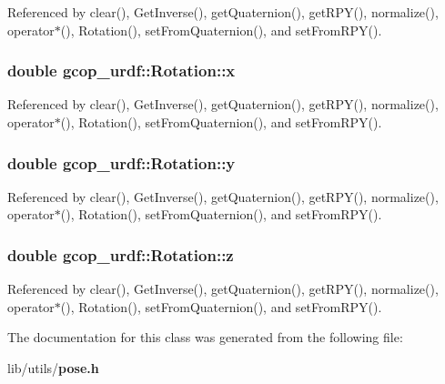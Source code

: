 \-Referenced by clear(), \-Get\-Inverse(), get\-Quaternion(), get\-R\-P\-Y(), normalize(), operator$\ast$(), \-Rotation(), set\-From\-Quaternion(), and set\-From\-R\-P\-Y().

\subsubsection[{x}]{\setlength{\rightskip}{0pt plus 5cm}double {\bf gcop\-\_\-urdf\-::\-Rotation\-::x}}\label{classgcop__urdf_1_1Rotation_af938927a04fcdd92dc1c143a7b387821}


\-Referenced by clear(), \-Get\-Inverse(), get\-Quaternion(), get\-R\-P\-Y(), normalize(), operator$\ast$(), \-Rotation(), set\-From\-Quaternion(), and set\-From\-R\-P\-Y().

\subsubsection[{y}]{\setlength{\rightskip}{0pt plus 5cm}double {\bf gcop\-\_\-urdf\-::\-Rotation\-::y}}\label{classgcop__urdf_1_1Rotation_a5bdcb247780b1ced0b9e49ee441f1728}


\-Referenced by clear(), \-Get\-Inverse(), get\-Quaternion(), get\-R\-P\-Y(), normalize(), operator$\ast$(), \-Rotation(), set\-From\-Quaternion(), and set\-From\-R\-P\-Y().

\subsubsection[{z}]{\setlength{\rightskip}{0pt plus 5cm}double {\bf gcop\-\_\-urdf\-::\-Rotation\-::z}}\label{classgcop__urdf_1_1Rotation_ab1c02ae2856ed4ffcf504104220906a2}


\-Referenced by clear(), \-Get\-Inverse(), get\-Quaternion(), get\-R\-P\-Y(), normalize(), operator$\ast$(), \-Rotation(), set\-From\-Quaternion(), and set\-From\-R\-P\-Y().



\-The documentation for this class was generated from the following file\-:\begin{DoxyCompactItemize}
\item 
lib/utils/{\bf pose.\-h}\end{DoxyCompactItemize}
